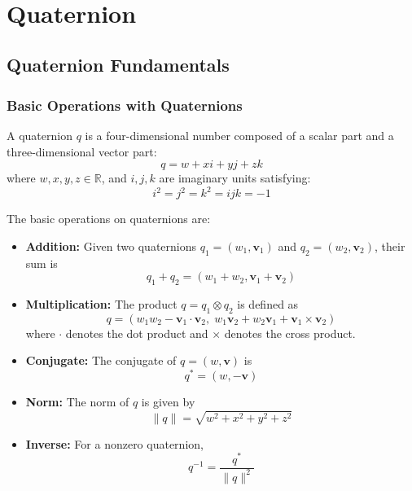 \documentclass{iutbscthesis}
\begin{document}

\sloppy  %
\printbib\




\chapter{Quaternion} 

\section{Quaternion Fundamentals}

\subsection{Basic Operations with Quaternions}

A quaternion $q$ is a four-dimensional number composed of a scalar part and a three-dimensional vector part:
\[
q = w + xi + yj + zk
\]
where $w, x, y, z \in \mathbb{R}$, and $i, j, k$ are imaginary units satisfying:
\[
i^2 = j^2 = k^2 = ijk = -1
\]

The basic operations on quaternions are:

\begin{itemize}
    \item \textbf{Addition:} Given two quaternions $q_1 = (w_1, \mathbf{v}_1)$ and $q_2 = (w_2, \mathbf{v}_2)$, their sum is
    \[
    q_1 + q_2 = (w_1 + w_2, \mathbf{v}_1 + \mathbf{v}_2)
    \]
    
    \item \textbf{Multiplication:} The product $q = q_1 \otimes q_2$ is defined as
    \[
    q = (w_1w_2 - \mathbf{v}_1 \cdot \mathbf{v}_2,\; w_1\mathbf{v}_2 + w_2\mathbf{v}_1 + \mathbf{v}_1 \times \mathbf{v}_2)
    \]
    where $\cdot$ denotes the dot product and $\times$ denotes the cross product.
    
    \item \textbf{Conjugate:} The conjugate of $q = (w, \mathbf{v})$ is
    \[
    q^* = (w, -\mathbf{v})
    \]
    
    \item \textbf{Norm:} The norm of $q$ is given by
    \[
    \|q\| = \sqrt{w^2 + x^2 + y^2 + z^2}
    \]
    
    \item \textbf{Inverse:} For a nonzero quaternion,
    \[
    q^{-1} = \frac{q^*}{\|q\|^2}
    \]
\end{itemize}
\end{document}
